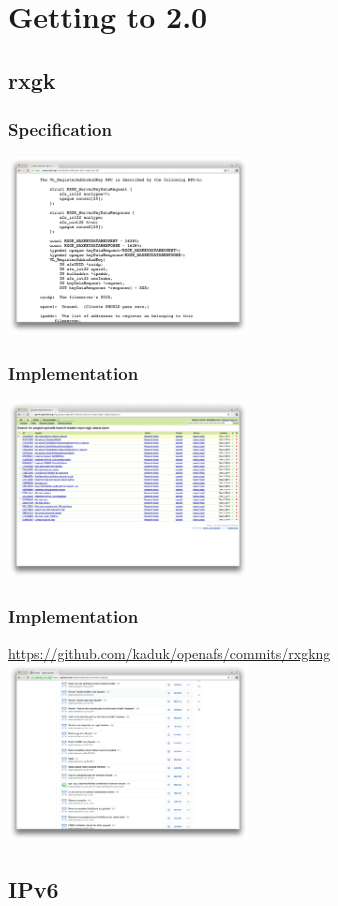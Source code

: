 \documentclass{beamer}
\begin{document}
\section{Getting to 2.0}

\subsection{rxgk}

\begin{frame}
\frametitle{Specification}
\includegraphics[width=2.5in]{rxgk-afs-snapshot}
\end{frame}

\begin{frame}
\frametitle{Implementation}
\includegraphics[width=2.5in]{gerrit-rxgk.png}
\end{frame}

\begin{frame}
\frametitle{Implementation}
\url{https://github.com/kaduk/openafs/commits/rxgkng}
\includegraphics[width=2.5in]{github-rxgk}
\end{frame}

\subsection{IPv6}
\end{document}
